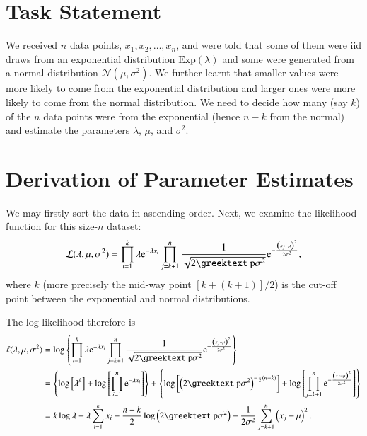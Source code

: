 \documentclass[a4paper,11pt,svgnames,dvipsnames]{article}
\renewcommand{\pi}{\text{\textrm{\greektext p}}}
\newcommand{\e}{\mathrm{e}}
\begin{document}
\RaggedRight

\section{Task Statement}

We received $n$ data points, $x_1, x_2, \ldots, x_{n}$, and were told that some of them were iid draws from an exponential distribution $\text{Exp}(\lambda)$ and some were generated from a normal distribution $\mathcal{N}(\mu, \sigma^2)$. We further learnt that smaller values were more likely to come from the exponential distribution and larger ones were more likely to come from the normal distribution. We need to decide how many (say $k$) of the $n$ data points were from the exponential (hence $n-k$ from the normal) and estimate the parameters $\lambda$, $\mu$, and $\sigma^2$.

\section{Derivation of Parameter Estimates}

We may firstly sort the data in ascending order. Next, we examine the likelihood function for this size-$n$ dataset:
\begin{equation}\label{lik}
    \mathcal{L}(\lambda, \mu, \sigma^2) = \prod_{i=1}^k \lambda \e^{-\lambda x_i} \prod_{j=k+1}^n \frac{1}{\sqrt{2\pi\sigma^2}} \e^{-\frac{\left( x_j-\mu \right)^2}{2\sigma^2}},
\end{equation}
where $k$ (more precisely the mid-way point $[k + (k+1)]/2$) is the cut-off point between the exponential and normal distributions.

The log-likelihood therefore is
\begin{equation}\label{loglik}
    \begin{aligned}
        \ell(\lambda, \mu, \sigma^2)
        & = \log\left\{ \prod_{i=1}^k \lambda \e^{-\lambda x_i} \prod_{j=k+1}^n \frac{1}{\sqrt{2\pi\sigma^2}} \e^{-\frac{\left( x_j-\mu \right)^2}{2\sigma^2}} \right\}              \\
        & = \left\{ \log\left[ \lambda^k \right] + \log\left[ \prod_{i=1}^n \e^{-\lambda x_i} \right] \right\}
        + \left\{ \log \left[ \left( 2\pi\sigma^2 \right)^{-\frac{1}{2}(n-k)} \right] + \log \left[ \prod_{j=k+1}^n \e^{-\frac{\left( x_j-\mu \right)^2}{2\sigma^2}} \right] \right\} \\
        & = k\log\lambda - \lambda\sum_{i=1}^k x_i - \frac{n-k}{2}\log\left( 2\pi\sigma^2 \right) - \frac{1}{2\sigma^2}\sum_{j=k+1}^n \left( x_j-\mu \right)^2.
    \end{aligned}
\end{equation}
\end{document}
